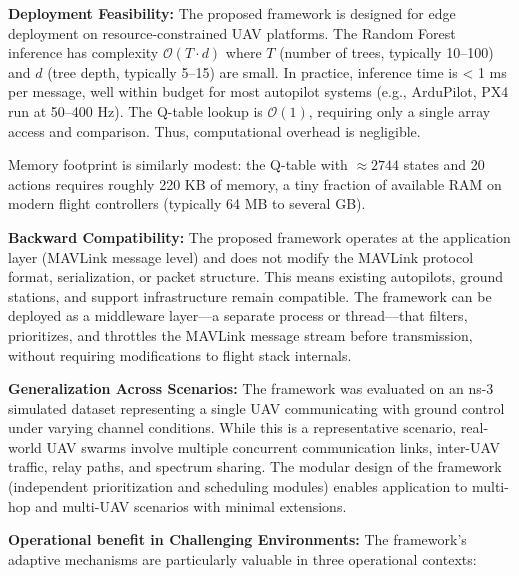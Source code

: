 \documentclass[pdflatex,sn-mathphys-num]{sn-jnl}%
\theoremstyle{thmstyleone}%
\theoremstyle{thmstyletwo}%
\theoremstyle{thmstylethree}%
\begin{document}
\textbf{Deployment Feasibility:} The proposed framework is designed for edge deployment on resource-constrained UAV platforms. The Random Forest inference has complexity $\mathcal{O}(T \cdot d)$ where $T$ (number of trees, typically 10–100) and $d$ (tree depth, typically 5–15) are small. In practice, inference time is < 1 ms per message, well within budget for most autopilot systems (e.g., ArduPilot, PX4 run at 50–400 Hz). The Q-table lookup is $\mathcal{O}(1)$, requiring only a single array access and comparison. Thus, computational overhead is negligible.

Memory footprint is similarly modest: the Q-table with $\approx 2744$ states and 20 actions requires roughly 220 KB of memory, a tiny fraction of available RAM on modern flight controllers (typically 64 MB to several GB).

\textbf{Backward Compatibility:} The proposed framework operates at the application layer (MAVLink message level) and does not modify the MAVLink protocol format, serialization, or packet structure. This means existing autopilots, ground stations, and support infrastructure remain compatible. The framework can be deployed as a middleware layer—a separate process or thread—that filters, prioritizes, and throttles the MAVLink message stream before transmission, without requiring modifications to flight stack internals.

\textbf{Generalization Across Scenarios:} The framework was evaluated on an ns-3 simulated dataset representing a single UAV communicating with ground control under varying channel conditions. While this is a representative scenario, real-world UAV swarms involve multiple concurrent communication links, inter-UAV traffic, relay paths, and spectrum sharing. The modular design of the framework (independent prioritization and scheduling modules) enables application to multi-hop and multi-UAV scenarios with minimal extensions.

\textbf{Operational benefit in Challenging Environments:} The framework's adaptive mechanisms are particularly valuable in three operational contexts:
\end{document}
